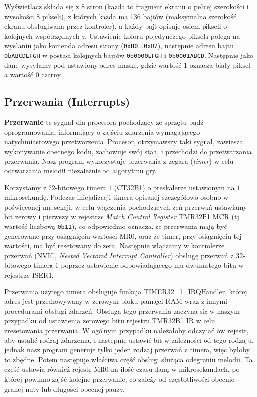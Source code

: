 \documentclass[a4paper,12pt,twoside]{article}
\theoremstyle{plain}
\theoremstyle{definition}
\theoremstyle{remark}
\begin{document}
Wyświetlacz składa się z 8 stron (każda to fragment ekranu o pełnej szerokości i wysokości 8 pikseli), 
z których każda ma 136 bajtów (maksymalna szerokość ekranu obsługiwana przez kontroler), a każdy bajt opisuje 
osiem pikseli o kolejnych współrzędnych y.
Ustawienie koloru pojedynczego piksela polega na wysłaniu jako komenda adresu strony (\verb|0xB0|...\verb|0xB7|), 
następnie adresu bajtu \verb|0bABCDEFGH| w postaci kolejnych bajtów 
\verb|0b0000EFGH| i \verb|0b0001ABCD|. Następnie jako dane wysyłamy pod ustawiony adres maskę, gdzie wartość 1 oznacza biały piksel a wartość 0 czarny.

\subsection{Przerwania (Interrupts)}

\textbf{Przerwanie} to sygnał dla procesora pochodzący ze sprzętu bądź oprogramowania, informujący o zajściu zdarzenia wymagającego natychmiastowego przetworzenia. Procesor, otrzymawszy taki sygnał, zawiesza wykonywanie obecnego kodu, zachowuje swój stan, i przechodzi do przetwarzania przerwania. Nasz program wykorzystuje przerwania z zegara (\textit{timer}) w celu odtwarzania melodii niezależnie od algorytmu gry.

Korzystamy z $32$-bitowego timera $1$ (CT32B1) o preskalerze ustawionym na $1$ mikrosekundę. Podczas inicjalizacji timera opisanej szczegółowo osobno w poświęconej mu sekcji, w celu włączenia pochodzących zeń przerwań ustawiamy bit zerowy i pierwszy w rejestrze \textit{Match Control Register} TMR32B1 MCR (tj. wartość liczbową \verb|0b11|), co odpowiednio oznacza, że przerwania mają być generowane przy osiągnięciu wartości MR0, oraz że timer, przy osiągnięciu tej wartości, ma być resetowany do zera. Następnie włączamy w kontrolerze przerwań (NVIC, \textit{Nested Vectored Interrupt Controller}) obsługę przerwań z $32$-bitowego timera $1$ poprzez ustawienie odpowiadającego mu dwunastego bitu w rejestrze ISER1.

Przerwania użytego timera obsługuje funkcja \mbox{TIMER32\_1\_IRQHandler}, której adres jest przechowywany w zerowym bloku pamięci RAM wraz z innymi procedurami obsługi zdarzeń. Obsługa tego przerwania zaczyna się w naszym przypadku od ustawienia zerowego bitu rejestru TMR32B1 IR w celu zresetowania przerwania. W ogólnym przypadku należałoby odczytać ów rejestr, aby ustalić rodzaj zdarzenia, i następnie ustawić bit w zależności od tego rodzaju, jednak nasz program generuje tylko jeden rodzaj przerwań z timera, więc byłoby to zbędne. Potem następuje właściwa część obsługi służąca odegraniu melodii. Ta część ustawia również rejestr MR0 na ilość czasu daną w mikrosekundach, po której powinno zajść kolejne przerwanie, co zależy od częstotliwości obecnie granej nuty lub długości obecnej pauzy.
\end{document}
